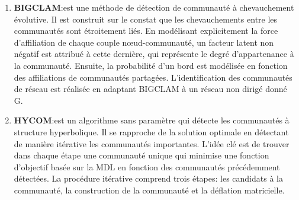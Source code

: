 \begin{enumerate}
				\item \textbf{BIGCLAM\citep{yang2013overlapping}}:est une méthode de détection de communauté à chevauchement évolutive. Il est construit sur le constat que les chevauchements entre les communautés sont étroitement liés. En modélisant explicitement la force d’affiliation de chaque couple nœud-communauté, un facteur latent non négatif est attribué à cette dernière, qui représente le degré d’appartenance à la communauté. Ensuite, la probabilité d'un bord est modélisée en fonction des affiliations de communautés partagées. L’identification des communautés de réseau est réalisée en adaptant BIGCLAM à un réseau non dirigé donné G.
				\item \textbf{HYCOM\citep{araujo2014beyond}}:est un algorithme sans paramètre qui détecte les communautés à structure hyperbolique. Il se rapproche de la solution optimale en détectant de manière itérative les communautés importantes. L'idée clé est de trouver dans chaque étape une communauté unique qui minimise une fonction d'objectif basée sur la MDL en fonction des communautés précédemment détectées. La procédure itérative comprend trois étapes: les candidats à la communauté, la construction de la communauté et la déflation matricielle.
				
			\end{enumerate}
			
